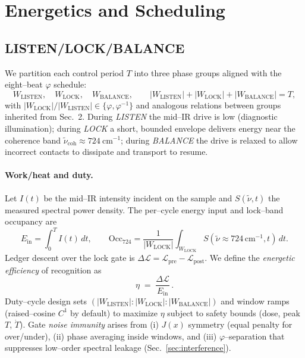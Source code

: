 \documentclass[11pt]{article}
\begin{document}
\section{Energetics and Scheduling}\label{sec:energetics}

\subsection{LISTEN/LOCK/BALANCE}
We partition each control period $T$ into three phase groups aligned with the eight--beat $\varphi$ schedule:
\[
W_{\mathrm{LISTEN}},\quad W_{\mathrm{LOCK}},\quad W_{\mathrm{BALANCE}},\qquad
|W_{\mathrm{LISTEN}}|+|W_{\mathrm{LOCK}}|+|W_{\mathrm{BALANCE}}|=T,
\]
with $|W_{\mathrm{LOCK}}|/|W_{\mathrm{LISTEN}}|\in\{\varphi,\varphi^{-1}\}$ and analogous relations between groups inherited from Sec.~2. During \emph{LISTEN} the mid--IR drive is low (diagnostic illumination); during \emph{LOCK} a short, bounded envelope delivers energy near the coherence band $\tilde\nu_{\mathrm{coh}}\approx 724~\mathrm{cm^{-1}}$; during \emph{BALANCE} the drive is relaxed to allow incorrect contacts to dissipate and transport to resume.

\paragraph{Work/heat and duty.}
Let $I(t)$ be the mid--IR intensity incident on the sample and $S(\tilde\nu,t)$ the measured spectral power density. The per--cycle energy input and lock--band occupancy are
\[
E_{\mathrm{in}}=\int_{0}^{T}\! I(t)\,dt,\qquad
\mathrm{Occ}_{724}=\frac{1}{|W_{\mathrm{LOCK}}|}\int_{W_{\mathrm{LOCK}}}\!\!\!\!S(\tilde\nu\!\approx\!724\,\mathrm{cm^{-1}},t)\,dt.
\]
Ledger descent over the lock gate is $\Delta\mathcal{L}=\mathcal{L}_{\mathrm{pre}}-\mathcal{L}_{\mathrm{post}}$. We define the \emph{energetic efficiency} of recognition as
\[
\eta\;=\;\frac{\Delta\mathcal{L}}{E_{\mathrm{in}}}\,.
\]
Duty--cycle design sets $(|W_{\mathrm{LISTEN}}|:|W_{\mathrm{LOCK}}|:|W_{\mathrm{BALANCE}}|)$ and window ramps (raised--cosine $C^1$ by default) to maximize $\eta$ subject to safety bounds (dose, peak $T$, $\dot T$). Gate \emph{noise immunity} arises from (i) $J(x)$ symmetry (equal penalty for over/under), (ii) phase averaging inside windows, and (iii) $\varphi$--separation that suppresses low--order spectral leakage (Sec.~\ref{sec:interference}).
\end{document}
